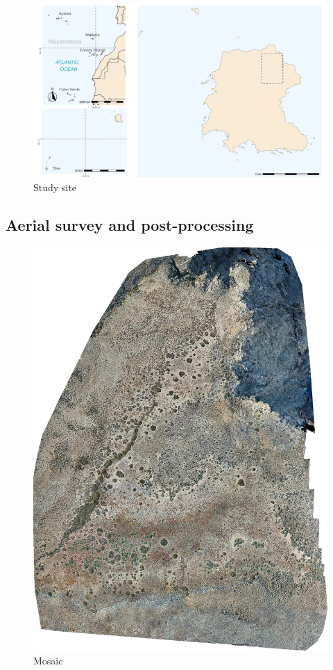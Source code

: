 \documentclass[12pt]{article}
\begin{document}
\begin{figure}[h]
	\caption{Study site}
	\centering
	\includegraphics[width=1\textwidth]{map}
\end{figure}


\subsection{Aerial survey and post-processing}

\begin{figure}[h]
	\centering
	\includegraphics[width=1\textwidth]{mosaic}
	\caption{Mosaic}
	\label{fig:mosaic}
\end{figure}
\end{document}
